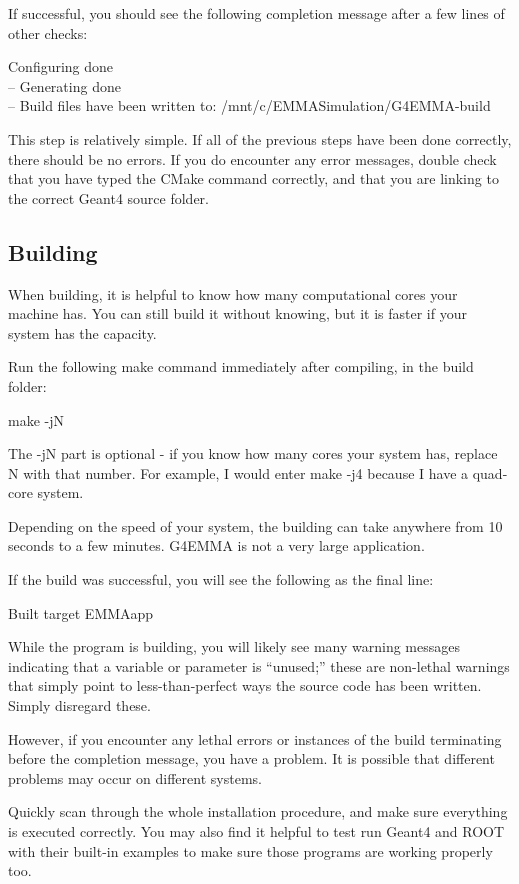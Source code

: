 \documentclass{article}
\newcommand{\filefont}[1]{{\fontfamily{pnc}\selectfont #1}\xspace}
\begin{document}
If successful, you should see the following completion message after a few lines of other checks:  

\filefont{Configuring done\\
-- Generating done\\
-- Build files have been written to: /mnt/c/EMMASimulation/G4EMMA-build}

This step is relatively simple. If all of the previous steps have been done correctly, there should be no errors. If you do encounter any error messages, double check that you have typed the CMake command correctly, and that you are linking to the correct Geant4 source folder. 

\subsection{Building}

When building, it is helpful to know how many computational cores your machine has. You can still build it without knowing, but it is faster if your system has the capacity. 

Run the following \filefont{make} command immediately after compiling, in the build folder: 

\filefont{make -jN}

The \filefont{-jN} part is optional - if you know how many cores your system has, replace N with that number. For example, I would enter \filefont{make -j4} because I have a quad-core system. 

Depending on the speed of your system, the building can take anywhere from 10 seconds to a few minutes. G4EMMA is not a very large application. 

If the build was successful, you will see the following as the final line: 

\filefont{[100\%] Built target EMMAapp}

While the program is building, you will likely see many warning messages indicating that a variable or parameter is ``unused;'' these are non-lethal warnings that simply point to less-than-perfect ways the source code has been written. Simply disregard these. 

However, if you encounter any lethal errors or instances of the build terminating before the completion message, you have a problem. It is possible that different problems may occur on different systems. 

Quickly scan through the whole installation procedure, and make sure everything is executed correctly. You may also find it helpful to test run Geant4 and ROOT with their built-in examples to make sure those programs are working properly too. 
\end{document}
